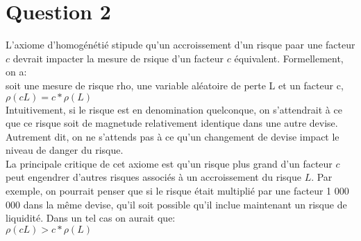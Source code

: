 \section{Question 2}

L'axiome d'homogénétié stipude qu'un accroissement d'un risque paar une facteur $c$ devrait impacter la mesure de rsique d'un facteur $c$ équivalent. Formellement, on a:\\
soit une mesure de risque rho, une variable aléatoire de perte L et un facteur c,\\
$\rho(cL) = c*\rho(L)$\\

Intuitivement, si le risque est en denomination quelconque, on s'attendrait à ce que ce risque soit de magnetude relativement identique dans une autre devise. Autrement dit, on ne s'attends pas à ce qu'un changement de devise impact le niveau de danger du risque. \\

La principale critique de cet axiome est qu'un risque plus grand d'un facteur $c$ peut engendrer d'autres risques associés à un accroissement du risque $L$. Par exemple, on pourrait penser que si le risque était multiplié par une facteur 1 000 000 dans la même devise, qu'il soit possible qu'il inclue maintenant un risque de liquidité. Dans un tel cas on aurait que: \\
$\rho(cL) > c*\rho(L)$\\